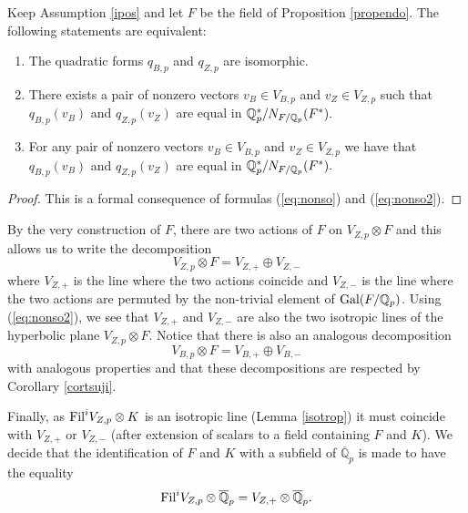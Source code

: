 \begin{corollary}
\notready\label{norms}
Keep Assumption  \ref{ipos} and let $F$ be the field of  Proposition \ref{propendo}. The following statements are equivalent:
\begin{enumerate}
\item The quadratic forms $q_{B,p}$ and $q_{Z,p}$ are isomorphic.
\item There exists a pair of nonzero vectors  $v_B\in V_{B,p}$ and $v_Z\in V_{Z,p}$ such that $q_{B,p}(v_B)$ and $q_{Z,p}(v_Z)$ are equal in $\mathbb{Q}_p^*/N_{F/\mathbb{Q}_p}(F^*).$
\item For any  pair of nonzero vectors  $v_B\in V_{B,p}$ and $v_Z\in V_{Z,p}$ we have that $q_{B,p}(v_B)$ and $q_{Z,p}(v_Z)$ are equal in $\mathbb{Q}_p^*/N_{F/\mathbb{Q}_p}(F^*).$
\end{enumerate}
\end{corollary}
\begin{proof}
This is a formal consequence of  formulas (\ref{eq:nonso}) and (\ref{eq:nonso2}).
\end{proof}
\begin{remark}
\notready\label{conventionF}
By the very construction of $F$, there are two actions of $F$ on  $V_{Z,p}\otimes F$ and this allows us to write the decomposition
\[V_{Z,p}\otimes F= V_{Z,+}  \oplus  V_{Z,-}\]
where $V_{Z,+}$ is the line where the two actions coincide and $V_{Z,-}$ is the line where the two actions are permuted by the non-trivial element of $\textnormal{Gal}(F/\mathbb{Q}_p)$. Using (\ref{eq:nonso2}), we see that $V_{Z,+}$ and $V_{Z,-}$ are also the two isotropic lines of the hyperbolic plane $V_{Z,p}\otimes F$. Notice that there is also an analogous decomposition
\[V_{B,p}\otimes F= V_{B,+} \oplus V_{B,-}\]
with analogous properties and that these decompositions are respected by Corollary \ref{cortsuji}.

Finally, as $\textnormal{Fil}^i V_{Z,p}\otimes K$ is an isotropic line (Lemma \ref{isotrop}) it must coincide with $V_{Z,+}$ or  $V_{Z,-}$ (after extension of scalars to a field containing $F$ and $K$). We decide that the identification of $F$ and $K$ with a subfield of $\overline{\mathbb{Q}}_p$ is made to have the equality
\[\textnormal{Fil}^i V_{Z,p}\otimes  \overline{\mathbb{Q}}_p = V_{Z,+} \otimes  \overline{\mathbb{Q}}_p.\]
\end{remark}
